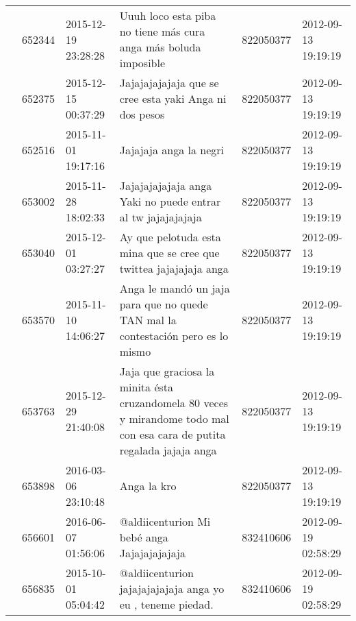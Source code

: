\begin{tabular}{llllrl}
           & 652344  & 2015-12-19 23:28:28 &                                                                              Uuuh loco esta piba no tiene más cura anga más boluda imposible &   822050377 & 2012-09-13 19:19:19 \\
           & 652375  & 2015-12-15 00:37:29 &                                                                                       Jajajajajajaja que se cree esta yaki Anga ni dos pesos &   822050377 & 2012-09-13 19:19:19 \\
           & 652516  & 2015-11-01 19:17:16 &                                                                                                                     Jajajaja anga la negri 💁 &   822050377 & 2012-09-13 19:19:19 \\
           & 653002  & 2015-11-28 18:02:33 &                                                                                  Jajajajajajaja anga Yaki no puede entrar al tw jajajajajaja &   822050377 & 2012-09-13 19:19:19 \\
           & 653040  & 2015-12-01 03:27:27 &                                                                            Ay que pelotuda esta mina que se cree que twittea jajajajaja anga &   822050377 & 2012-09-13 19:19:19 \\
           & 653570  & 2015-11-10 14:06:27 &                                                             Anga le mandó un jaja para que no quede TAN mal la contestación pero es lo mismo &   822050377 & 2012-09-13 19:19:19 \\
           & 653763  & 2015-12-29 21:40:08 &                      Jaja que graciosa la minita ésta cruzandomela 80 veces y mirandome todo mal con esa cara de putita regalada jajaja anga &   822050377 & 2012-09-13 19:19:19 \\
           & 653898  & 2016-03-06 23:10:48 &                                                                                                                                  Anga la kro &   822050377 & 2012-09-13 19:19:19 \\
           & 656601  & 2016-06-07 01:56:06 &                                                                                                  @aldiicenturion Mi bebé anga Jajajajajajaja &   832410606 & 2012-09-19 02:58:29 \\
           & 656835  & 2015-10-01 05:04:42 &                                                                                   @aldiicenturion jajajajajajaja anga yo eu , teneme piedad. &   832410606 & 2012-09-19 02:58:29 \\

\end{tabular}
